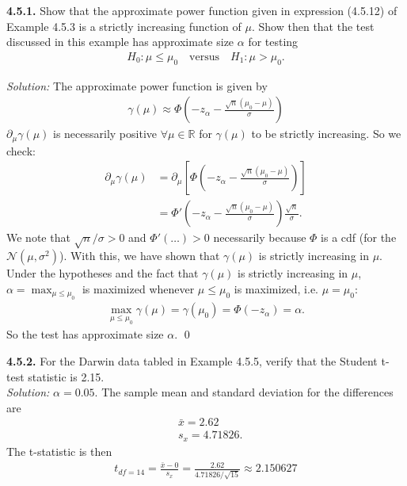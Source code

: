 \documentclass{book}
\theoremstyle{definition}
\newcommand{\p}{\partial}
\newcommand{\nn}{\nonumber}
\newcommand{\al}{\alpha}
\newcommand{\N}{\mathcal{N}}
\newcommand{\f}[2]{\frac{#1}{#2}}
\newcommand{\lp}{\left(}
\newcommand{\rp}{\right)}
\newcommand{\lb}{\left[}
\newcommand{\rb}{\right]}
\begin{document}
\newpage
\noindent\textbf{4.5.1.} Show that the approximate power function given in expression (4.5.12) of
Example 4.5.3 is a strictly increasing function of $\mu$. Show then that the test discussed
in this example has approximate size $\alpha$ for testing
\begin{align}
H_0: \mu \leq \mu_0\quad \text{versus} \quad H_1: \mu > \mu_0.
\end{align}


\noindent \textit{Solution:} The approximate power function is given by
\begin{align}
\gamma(\mu) \approx \Phi \lp -z_\alpha - \f{\sqrt{n}(\mu_0 - \mu)}{\sigma} \rp
\end{align}
$\p_\mu \gamma(\mu)$ is necessarily positive $\forall \mu \in \mathbb{R}$ for $\gamma(\mu)$ to be strictly increasing. So we check:
\begin{align}
\p_\mu \gamma(\mu) &= \p_\mu \lb \Phi \lp -z_\alpha - \f{\sqrt{n}(\mu_0 - \mu)}{\sigma} \rp  \rb \nn\\
&= \Phi' \lp -z_\alpha - \f{\sqrt{n}(\mu_0 - \mu)}{\sigma} \rp \f{\sqrt{n}}{\sigma}.
\end{align}
We note that $\sqrt{n}/\sigma > 0$ and $\Phi'(\dots) > 0$ necessarily because $\Phi$ is a cdf (for the $\N(\mu,\sigma^2)$). With this, we have shown that $\gamma(\mu)$ is strictly increasing in $\mu$.\\

\noindent Under the hypotheses and the fact that $\gamma(\mu)$ is strictly increasing in $\mu$, $\al = \max_{\mu \leq \mu_0}$ is maximized whenever $\mu \leq \mu_0$ is maximized, i.e. $\mu = \mu_0$:
\begin{align}
\max_{\mu \leq \mu_0} \gamma(\mu) = \gamma(\mu_0) = \Phi(-z_\alpha) = \alpha.
\end{align}
So the test has approximate size $\alpha$. \qed







\newpage
\noindent\textbf{4.5.2.} For the Darwin data tabled in Example 4.5.5, verify that the Student t-test
statistic is 2.15. \\


\noindent \textit{Solution:} $\al = 0.05$. The sample mean and standard deviation for the differences are
\begin{align}
&\bar{x} = 2.62\\
&s_x = 4.71826.
\end{align}
The t-statistic is then
\begin{align}
t_{df=14}= \f{\bar{x}-0}{s_x} = \f{2.62}{4.71826/\sqrt{15}} \approx \boxed{2.150627}
\end{align}
\end{document}
